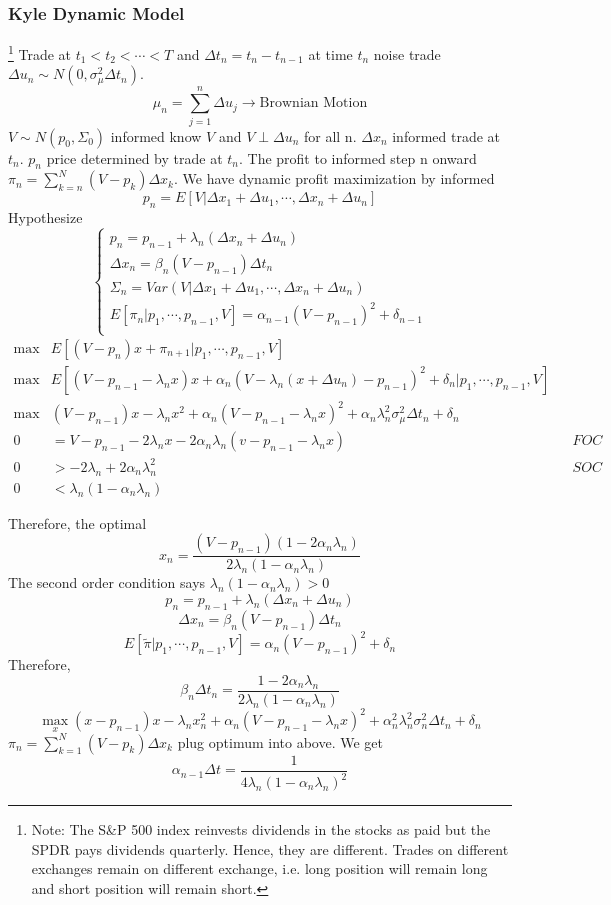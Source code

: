 \documentclass[11pt, a4paper, oneside]{article}
\theoremstyle{definition}
\theoremstyle{proposition}
\theoremstyle{corollary}
\theoremstyle{lemma}
\theoremstyle{theorem}
\begin{document}
\subsubsection{Kyle Dynamic Model}\footnote{Note: The S\&P 500 index reinvests dividends in the stocks as paid but the SPDR pays dividends quarterly. Hence, they are different. Trades on different exchanges remain on different exchange, i.e. long position will remain long and short position will remain short. }
Trade at $t_1< t_2<\cdots<T$ and $\Delta t_n = t_n - t_{n-1}$ at time $t_n$ noise trade $\Delta u_n \sim N(0, \sigma_{\mu}^2\Delta t_n)$. 
$$\mu_n = \sum_{j=1}^n \Delta u_j \to \text{Brownian Motion}$$
$V \sim N(p_0, \Sigma_0)$ informed know $V$ and $V \perp \Delta u_n$ for all n. $\Delta x_n$ informed trade at $t_n$. $p_n$ price determined by trade at $t_n$. The profit to informed step n onward $\pi_n = \sum_{k=n}^N (V- p_k) \Delta x_k$. We have dynamic profit maximization by informed 
$$p_n = E[V|\Delta x_1 + \Delta u_1, \cdots, \Delta x_n + \Delta u_n]$$ 
Hypothesize 
$$\begin{cases} p_n = p_{n-1} + \lambda_n(\Delta x_n +\Delta u_n) \\ 
\Delta x_n = \beta_n(V - p_{n-1}) \Delta t_n \\
\Sigma_n = Var(V|\Delta x_1+ \Delta u_1, \cdots, \Delta x_n+ \Delta u_n) \\
E[\pi_n|p_1, \cdots, p_{n-1}, V] = \alpha_{n-1}(V- p_{n-1})^2 +\delta_{n-1}\\ 
\end{cases}$$
\begin{align*}
\max &E[(V - p_n) x + \pi_{n+1}|p_1, \cdots, p_{n-1}, V]\\
\max &E[(V- p_{n-1}-\lambda_n x)x + \alpha_n(V - \lambda_n(x+\Delta u_n) - p_{n-1})^2 + \delta_n|p_1, \cdots, p_{n-1}, V] \\
\max & (V - p_{n-1})x - \lambda_n x^2 + \alpha_n(V - p_{n-1} - \lambda_n x)^2 + \alpha_n \lambda_n^2 \sigma_{\mu}^2\Delta t_n + \delta_n\\
0 &= V - p_{n-1} - 2\lambda_n x - 2 \alpha_n \lambda_n ( v - p_{n-1} - \lambda_n x) && FOC\\
0 & > -2\lambda_n + 2\alpha_n \lambda_n^2 && SOC \\
0 & < \lambda_n(1- \alpha_n \lambda_n)
\end{align*}

Therefore, the optimal
$$x_n = \frac{(V - p_{n-1})(1- 2\alpha_n \lambda_n)}{2\lambda_n(1- \alpha_n \lambda_n)}$$
The second order condition says $\lambda_n(1- \alpha_n \lambda_n) > 0$
$$p_n = p_{n-1} + \lambda_n(\Delta x_n + \Delta u_n)$$
$$\Delta x_n = \beta_n(V - p_{n-1})\Delta t_n$$
$$E[\tilde{\pi}|p_1, \cdots, p_{n-1}, V] = \alpha_n(V - p_{n-1})^2 + \delta_n$$ 
Therefore, 
$$\beta_n \Delta t_n = \frac{1- 2 \alpha_n \lambda_n}{2\lambda_n(1- \alpha_n\lambda_n)}$$
$$\max_x (x - p_{n-1}) x - \lambda_n x_n^2 + \alpha_n(V - p_{n-1} - \lambda_n x)^2 + \alpha_n^2\lambda_n^2\sigma_n^2\Delta t_n + \delta_n$$
$\pi_n = \sum_{k=1}^N(V - p_k)\Delta x_k$ plug optimum into above. We get
$$\alpha_{n-1} \Delta t= \frac{1}{4 \lambda_n(1- \alpha_n \lambda_n)^2}$$
\end{document}
